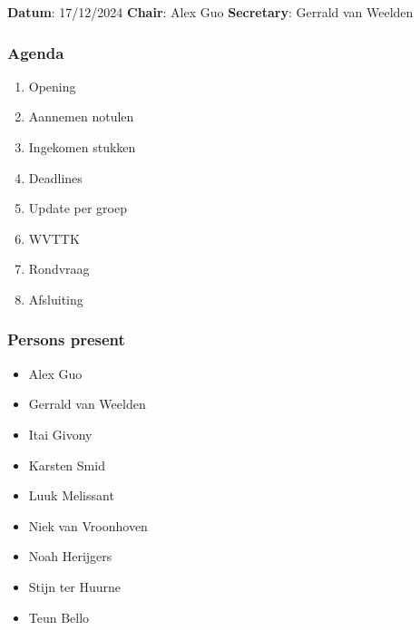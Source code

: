 \textbf{Datum}: 17/12/2024 \newline
\textbf{Chair}: Alex Guo \newline
\textbf{Secretary}: Gerrald van Weelden \newline

\subsubsection{\textbf{Agenda}}
\begin{enumerate}
    \item Opening 
    \item Aannemen notulen 
    \item Ingekomen stukken
    \item Deadlines 
    \item Update per groep 
    \item WVTTK 
    \item Rondvraag 
    \item Afsluiting 
\end{enumerate}
\subsubsection{\textbf{Persons present}}
\begin{itemize}
    \item Alex Guo 
    \item Gerrald van Weelden
    \item Itai Givony 
    \item Karsten Smid 
    \item Luuk Melissant 
    \item Niek van Vroonhoven 
    \item Noah Herijgers 
    \item Stijn ter Huurne 
    \item Teun Bello
\end{itemize}
